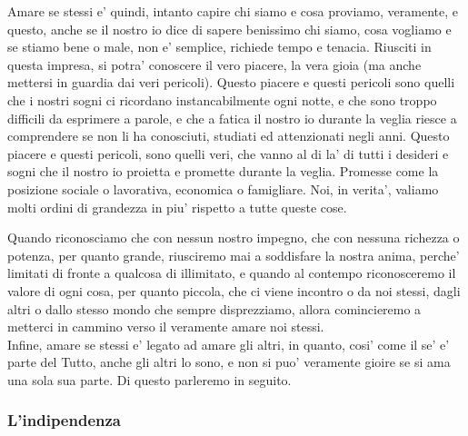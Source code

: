 Amare se stessi e' quindi, intanto capire chi siamo e cosa proviamo, veramente, e questo, anche se il nostro io dice di sapere benissimo chi siamo, cosa vogliamo e se stiamo bene o male, non e' semplice, richiede tempo e tenacia. Riusciti in questa impresa, si potra' conoscere il vero piacere, la vera gioia (ma anche mettersi in guardia dai veri pericoli). Questo piacere e questi pericoli sono quelli che i nostri sogni ci ricordano instancabilmente ogni notte, e che sono troppo difficili da esprimere a parole, e che a fatica il nostro io durante la veglia riesce a comprendere se non li ha conosciuti, studiati ed attenzionati negli anni. Questo piacere e questi pericoli, sono quelli veri, che vanno al di la' di tutti i desideri e sogni che il nostro io proietta e promette durante la veglia. Promesse come la posizione sociale o lavorativa, economica o famigliare. Noi, in verita', valiamo molti ordini di grandezza in piu' rispetto a tutte queste cose.

Quando riconosciamo che con nessun nostro impegno, che con nessuna richezza o potenza, per quanto grande, riusciremo mai a soddisfare la nostra anima, perche' limitati di fronte a qualcosa di illimitato, e quando al contempo riconosceremo il valore di ogni cosa, per quanto piccola, che ci viene incontro o da noi stessi, dagli altri o dallo stesso mondo che sempre disprezziamo, allora comincieremo a metterci in cammino verso il veramente amare noi stessi.\\

Infine, amare se stessi e' legato ad amare gli altri, in quanto, cosi' come il se' e' parte del Tutto, anche gli altri lo sono, e non si puo' veramente gioire se si ama una sola sua parte. Di questo parleremo in seguito.

\subsubsection{L'indipendenza}

